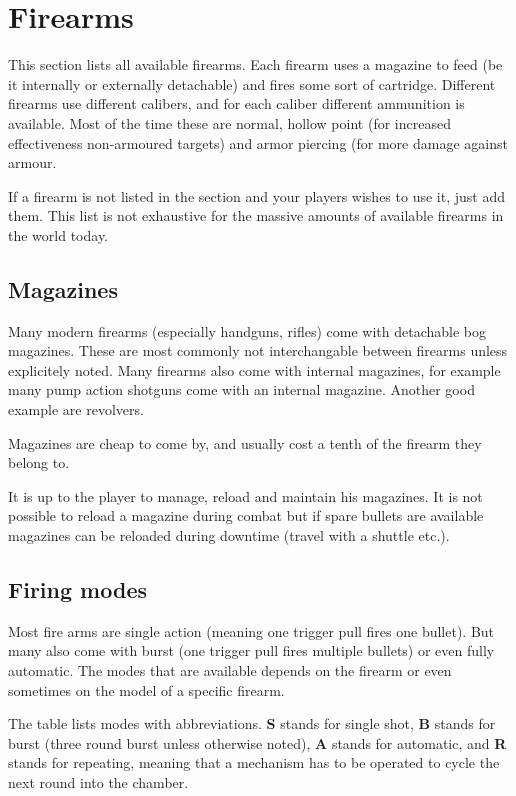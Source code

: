 \section{Firearms}

This section lists all available firearms. Each firearm uses a magazine to feed
(be it internally or externally detachable) and fires some sort of cartridge.
Different firearms use different calibers, and for each caliber different
ammunition is available. Most of the time these are normal, hollow point (for
increased effectiveness non-armoured targets) and armor piercing (for more
damage against armour.

If a firearm is not listed in the section and your players wishes to use it,
just add them. This list is not exhaustive for the massive amounts of available
firearms in the world today.

\subsection{Magazines}

Many modern firearms (especially handguns, rifles) come with detachable bog
magazines. These are most commonly not interchangable between firearms unless
explicitely noted. Many firearms also come with internal magazines, for example
many pump action shotguns come with an internal magazine. Another good example
are revolvers.

Magazines are cheap to come by, and usually cost a tenth of the firearm they
belong to.

It is up to the player to manage, reload and maintain his magazines. It is not
possible to reload a magazine during combat but if spare bullets are available
magazines can be reloaded during downtime (travel with a shuttle etc.).

\subsection{Firing modes}

Most fire arms are single action (meaning one trigger pull fires one bullet).
But many also come with burst (one trigger pull fires multiple bullets) or
even fully automatic. The modes that are available depends on the firearm or
even sometimes on the model of a specific firearm.

The table lists modes with abbreviations. \textbf{S} stands for single shot,
\textbf{B} stands for burst (three round burst unless otherwise noted),
\textbf{A} stands for automatic, and \textbf{R} stands for repeating, meaning
that a mechanism has to be operated to cycle the next round into the chamber.

